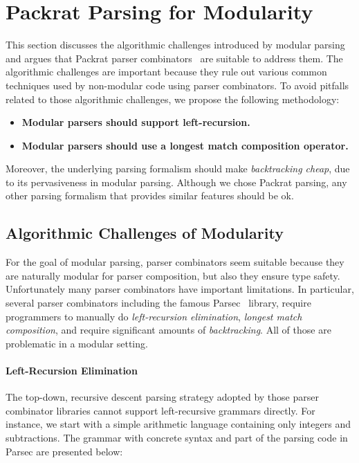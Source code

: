 \vspace{-2pt}
\section{Packrat Parsing for Modularity}\label{sec:packrat}

This section discusses the algorithmic challenges introduced by
modular parsing and argues that Packrat parser combinators~\cite{Ford2002}
are suitable to address them. The algorithmic challenges
are important because they rule out various common techniques
used by non-modular code using parser combinators.
To avoid pitfalls related to those algorithmic challenges,
we propose the following methodology:

\vspace{-2pt}
\begin{itemize}[leftmargin=*]

\item \textbf{Modular parsers should support left-recursion.}

\item \textbf{Modular parsers should use a longest match composition operator.}

\end{itemize}
\vspace{-2pt}

Moreover, the underlying parsing formalism should make \emph{backtracking
cheap}, due to its pervasiveness in modular parsing.
Although we chose Packrat parsing, any other parsing formalism that provides similar
features should be ok.

\subsection{Algorithmic Challenges of Modularity}\label{subsec:challenges}
For the goal of modular parsing, parser combinators seem suitable because they are
naturally modular for parser composition, but also they ensure type safety.
Unfortunately many parser combinators have important limitations.
In particular, several parser combinators including the famous Parsec~\cite{Leijen2001} library, require
programmers to manually do \textit{left-recursion elimination}, \textit{longest match composition}, and
require significant amounts of \textit{backtracking}. All of those are
problematic in a modular setting.

\paragraph{Left-Recursion Elimination} The top-down, recursive descent parsing strategy adopted by those parser combinator libraries cannot support left-recursive grammars directly. For instance, we start with a simple arithmetic language containing only integers and subtractions. The
grammar with concrete syntax and part of the parsing code in Parsec are presented below:

